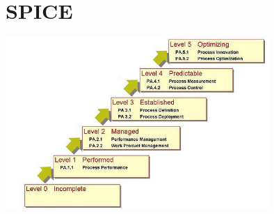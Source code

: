 \newpage
\section{SPICE}

\begin{center}
\includegraphics[keepaspectratio = true, width=10cm]{SPICE.jpg}
\end{center}

